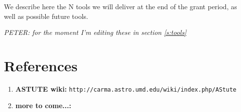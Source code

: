 \documentclass[preprint]{aastex} %
\begin{document}
We describe here the N tools we will deliver at the end of the grant
period, as well as possible future tools.

{\it  PETER: for the moment I'm editing these in section \ref{s:tools}}



\section*{References}

\begin{enumerate}
\item
{\bf ASTUTE wiki:} {\tt  http://carma.astro.umd.edu/wiki/index.php/AStute}

\item
{\bf more to come...:}

\end{enumerate}
\end{document}
